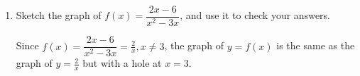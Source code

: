 \documentclass{article}
\begin{document}
\begin{enumerate}
\begin{enumerate}
\begin{enumerate}
    \item
      \begin{problem}[\stretch{0.5}]
        $\displaystyle \lim_{x \to 0} \frac{2x - 6}{x^2 - 3x}$
      \end{problem}

      \begin{solution}
        Factor and cancel.
        \[
          \lim_{x \to 0} \frac{2x - 6}{x^2 - 3x} = \lim_{x \to 0} \frac{2(x-3)}{x(x-3)}
          = \lim_{x \to 0} \frac{2}{x} 
          = \text{DNE}
        \]

        Looking at the one-sided limits:
        \[
          \lim_{x \to 0^-} \frac{2x - 6}{x^2 - 3x}
          = \lim_{x \to 0^-} \frac{2}{x} 
          = -\infty
        \]
        \[
          \lim_{x \to 0^+} \frac{2x - 6}{x^2 - 3x}
          = \lim_{x \to 0^+} \frac{2}{x} 
          = \infty
        \] 
      \end{solution}

    \item
      \begin{problem}[\stretch{0.5}]
        $\displaystyle \lim_{x \to 3} \frac{2x - 6}{x^2 - 3x}$
      \end{problem}

      \begin{solution}
        Factor and cancel.
        \[
          \lim_{x \to 3} \frac{2x - 6}{x^2 - 3x} = \lim_{x \to 3} \frac{2(x-3)}{x(x-3)} 
          = \lim_{x \to 3} \frac{2}{x} 
          = \frac{2}{3}.
        \]
      \end{solution}

    \end{enumerate}

  \item

    \begin{problem}[\vfill\newpage]
      Sketch the graph of $f(x) = \dfrac{2x - 6}{x^2 - 3x}$, and use it to check your answers. 
    \end{problem}

    \begin{solution}
      Since $f(x) = \dfrac{2x-6}{x^2-3x}=\frac{2}{x}, x\neq 3$, the graph of $y=f(x)$ is the same as the graph
      of $y=\frac{2}{x}$ but with a hole at $x=3$.

    \end{solution}


\end{enumerate}
\end{enumerate}
\end{document}
